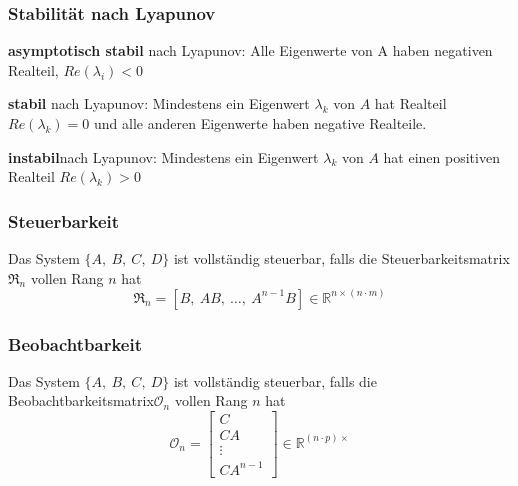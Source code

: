     \subsubsection{Stabilität nach Lyapunov}
    \textbf{asymptotisch stabil} nach Lyapunov: 
    Alle Eigenwerte von A haben negativen Realteil, $Re(\lambda_i) < 0$
    
    \textbf{stabil} nach Lyapunov:
    Mindestens ein Eigenwert $\lambda_k$ von $A$ hat Realteil $Re(\lambda_k) = 0$ und alle anderen Eigenwerte haben negative Realteile.
    
    \textbf{instabil}nach Lyapunov:
    Mindestens ein Eigenwert $\lambda_k$ von $A$ hat einen positiven Realteil $Re(\lambda_k) > 0$
    
    \subsubsection{Steuerbarkeit}
        Das System $\{A,\ B,\ C,\ D\}$ ist vollständig steuerbar, falls die Steuerbarkeitsmatrix $\Re_n$ vollen Rang $n$ hat
    \[\Re_n = [B,\ AB,\ \dots,\ A^{n-1}B]\in \mathbb{R}^{n\times(n\cdot m)}\]
    
    \subsubsection{Beobachtbarkeit}
        Das System $\{A,\ B,\ C,\ D\}$ ist vollständig steuerbar, falls die Beobachtbarkeitsmatrix$\mathcal{O}_n$ vollen Rang $n$ hat
        \[\mathcal{O}_n = \begin{bmatrix} C\\ CA\\ \vdots\\ CA^{n-1}\end{bmatrix}\in \mathbb{R}^{(n\cdot p)\times }\]
        
